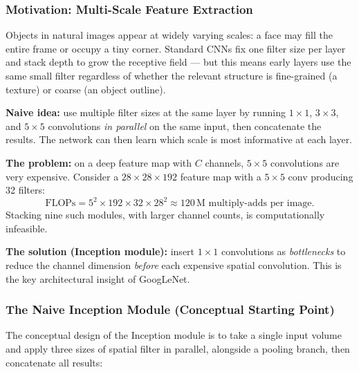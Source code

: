 \documentclass[11pt,a4paper]{article}
\begin{document}
\subsubsection{Motivation: Multi-Scale Feature Extraction}

Objects in natural images appear at widely varying scales: a face may fill the entire frame or
occupy a tiny corner.  Standard CNNs fix one filter size per layer and stack depth to grow the
receptive field — but this means early layers use the same small filter regardless of whether the
relevant structure is fine-grained (a texture) or coarse (an object outline).

\textbf{Naive idea:} use multiple filter sizes at the same layer by running $1\times1$,
$3\times3$, and $5\times5$ convolutions \emph{in parallel} on the same input, then concatenate
the results.  The network can then learn which scale is most informative at each layer.

\textbf{The problem:} on a deep feature map with $C$ channels, $5\times5$ convolutions are
very expensive.  Consider a $28\times28\times192$ feature map with a $5\times5$ conv producing
32 filters:
\[
\text{FLOPs} = 5^2 \times 192 \times 32 \times 28^2 \approx 120\,\text{M multiply-adds per image.}
\]
Stacking nine such modules, with larger channel counts, is computationally infeasible.

\textbf{The solution (Inception module):} insert $1\times1$ convolutions as \emph{bottlenecks}
to reduce the channel dimension \emph{before} each expensive spatial convolution.  This is the
key architectural insight of GoogLeNet.

\subsubsection{The Naive Inception Module (Conceptual Starting Point)}

The conceptual design of the Inception module is to take a single input volume and apply three
sizes of spatial filter in parallel, alongside a pooling branch, then concatenate all results:
\end{document}
